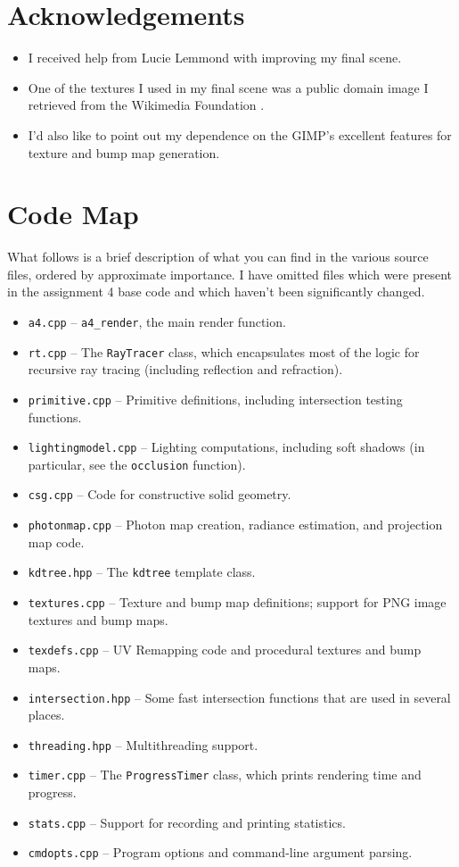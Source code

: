 \documentclass{article}
\begin{document}
\section{Acknowledgements}

\begin{itemize}
  \item I received help from Lucie Lemmond with improving my final scene.

  \item One of the textures I used in my final scene was a public domain image I retrieved from the Wikimedia Foundation \cite{wikimedia}.

  \item I'd also like to point out my dependence on the GIMP's excellent features for texture and bump map generation.
\end{itemize}

\section{Code Map}

What follows is a brief description of what you can find in the various source
files, ordered by approximate importance. I have omitted files which were
present in the assignment 4 base code and which haven't been significantly
changed.

\newcommand{\cmditem}[1]{\item {\tt #1}}

\begin{itemize}
    \cmditem{a4.cpp} -- {\tt a4\_render}, the main render function.
    \cmditem{rt.cpp} -- The {\tt RayTracer} class, which encapsulates most of
    the logic for recursive ray tracing (including reflection and refraction).
    \cmditem{primitive.cpp} -- Primitive definitions, including intersection
    testing functions.
    \cmditem{lightingmodel.cpp} -- Lighting computations, including soft shadows
    (in particular, see the {\tt occlusion} function).
    \cmditem{csg.cpp} -- Code for constructive solid geometry.
    \cmditem{photonmap.cpp} -- Photon map creation, radiance estimation, and
    projection map code.
    \cmditem{kdtree.hpp} -- The {\tt kdtree} template class.
    \cmditem{textures.cpp} -- Texture and bump map definitions; support for
    PNG image textures and bump maps.
    \cmditem{texdefs.cpp} -- UV Remapping code and procedural textures and bump
    maps.
    \cmditem{intersection.hpp} -- Some fast intersection functions that are used
    in several places.
    \cmditem{threading.hpp} -- Multithreading support.
    \cmditem{timer.cpp} -- The {\tt ProgressTimer} class, which prints rendering
    time and progress.
    \cmditem{stats.cpp} -- Support for recording and printing statistics.
    \cmditem{cmdopts.cpp} -- Program options and command-line argument parsing.
\end{itemize}
\end{document}
